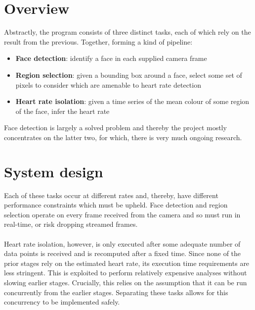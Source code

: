 \section{Overview}
Abstractly, the program consists of three distinct tasks, each of which rely on the result from the previous. Together, forming a kind of pipeline:
\begin{itemize}
    \item \textbf{Face detection}: identify a face in each supplied camera frame
    \item \textbf{Region selection}: given a bounding box around a face, select some set of pixels to consider which are amenable to heart rate detection
    \item \textbf{Heart rate isolation}: given a time series of the mean colour of some region of the face, infer the heart rate
\end{itemize}
Face detection is largely a solved problem and thereby the project mostly concentrates on the latter two, for which, there is very much ongoing research.

\section{System design}
\label{section:system_design}
Each of these tasks occur at different rates and, thereby, have different performance constraints which must be upheld. Face detection and region selection operate on every frame received from the camera and so must run in real-time, or risk dropping streamed frames.
\\ \\
Heart rate isolation, however, is only executed after some adequate number of data points is received and is recomputed after a fixed time. Since none of the prior stages rely on the estimated heart rate, its execution time requirements are less stringent. This is exploited to perform relatively expensive analyses without slowing earlier stages. Crucially, this relies on the assumption that it can be run concurrently from the earlier stages.
Separating these tasks allows for this concurrency to be implemented safely.

